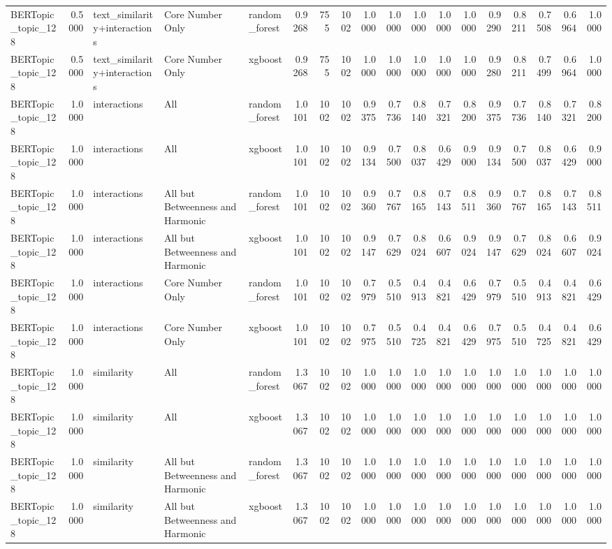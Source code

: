 \begin{tabular}{lrlllrrrrrrrrrrrrr}
BERTopic_topic_128 & 0.5000 & text_similarity+interactions & Core Number Only & random_forest & 0.9268 & 755 & 1002 & 1.0000 & 1.0000 & 1.0000 & 1.0000 & 1.0000 & 0.9290 & 0.8211 & 0.7508 & 0.6964 & 1.0000 \\
BERTopic_topic_128 & 0.5000 & text_similarity+interactions & Core Number Only & xgboost & 0.9268 & 755 & 1002 & 1.0000 & 1.0000 & 1.0000 & 1.0000 & 1.0000 & 0.9280 & 0.8211 & 0.7499 & 0.6964 & 1.0000 \\
BERTopic_topic_128 & 1.0000 & interactions & All & random_forest & 1.0101 & 1002 & 1002 & 0.9375 & 0.7736 & 0.8140 & 0.7321 & 0.8200 & 0.9375 & 0.7736 & 0.8140 & 0.7321 & 0.8200 \\
BERTopic_topic_128 & 1.0000 & interactions & All & xgboost & 1.0101 & 1002 & 1002 & 0.9134 & 0.7500 & 0.8037 & 0.6429 & 0.9000 & 0.9134 & 0.7500 & 0.8037 & 0.6429 & 0.9000 \\
BERTopic_topic_128 & 1.0000 & interactions & All but Betweenness and Harmonic & random_forest & 1.0101 & 1002 & 1002 & 0.9360 & 0.7767 & 0.8165 & 0.7143 & 0.8511 & 0.9360 & 0.7767 & 0.8165 & 0.7143 & 0.8511 \\
BERTopic_topic_128 & 1.0000 & interactions & All but Betweenness and Harmonic & xgboost & 1.0101 & 1002 & 1002 & 0.9147 & 0.7629 & 0.8024 & 0.6607 & 0.9024 & 0.9147 & 0.7629 & 0.8024 & 0.6607 & 0.9024 \\
BERTopic_topic_128 & 1.0000 & interactions & Core Number Only & random_forest & 1.0101 & 1002 & 1002 & 0.7979 & 0.5510 & 0.4913 & 0.4821 & 0.6429 & 0.7979 & 0.5510 & 0.4913 & 0.4821 & 0.6429 \\
BERTopic_topic_128 & 1.0000 & interactions & Core Number Only & xgboost & 1.0101 & 1002 & 1002 & 0.7975 & 0.5510 & 0.4725 & 0.4821 & 0.6429 & 0.7975 & 0.5510 & 0.4725 & 0.4821 & 0.6429 \\
BERTopic_topic_128 & 1.0000 & similarity & All & random_forest & 1.3067 & 1002 & 1002 & 1.0000 & 1.0000 & 1.0000 & 1.0000 & 1.0000 & 1.0000 & 1.0000 & 1.0000 & 1.0000 & 1.0000 \\
BERTopic_topic_128 & 1.0000 & similarity & All & xgboost & 1.3067 & 1002 & 1002 & 1.0000 & 1.0000 & 1.0000 & 1.0000 & 1.0000 & 1.0000 & 1.0000 & 1.0000 & 1.0000 & 1.0000 \\
BERTopic_topic_128 & 1.0000 & similarity & All but Betweenness and Harmonic & random_forest & 1.3067 & 1002 & 1002 & 1.0000 & 1.0000 & 1.0000 & 1.0000 & 1.0000 & 1.0000 & 1.0000 & 1.0000 & 1.0000 & 1.0000 \\
BERTopic_topic_128 & 1.0000 & similarity & All but Betweenness and Harmonic & xgboost & 1.3067 & 1002 & 1002 & 1.0000 & 1.0000 & 1.0000 & 1.0000 & 1.0000 & 1.0000 & 1.0000 & 1.0000 & 1.0000 & 1.0000 \\

\end{tabular}
